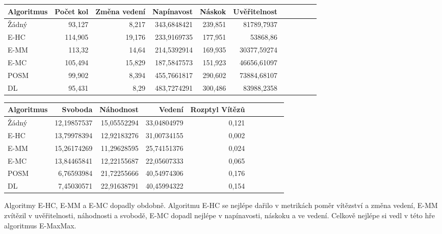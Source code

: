 \begin{table*}[b]\footnotesize
\vspace*{0mm}
\caption{{\label{tab-mazem}} Porovnání metrik zábavnosti u jednotlivých algoritmů ve hře Bludiště. Metriky změna vedení a svoboda se maximalizují, zbytek minimalizuje.}
\vspace*{0mm}
\label{shadowtable}
\begin{center}
\begin{tabular}{| l || r | r | r | r | r | r | r | r | r | r |}
\hline
Algoritmus & Počet kol	& Změna vedení & Napínavost & Náskok & Uvěřitelnost\\
\hline
\hline
Žádný & 93,127 & 8,217 & 343,6848421 & 239,851 & 81789,7937 \\ \hline  
E-HC & 114,905 & 19,176 & 233,9169735 & 177,951 & 53868,86 \\ \hline
E-MM & 113,32 & 14,64 & 214,5392914 & 169,935 & 30377,59274 \\ \hline
E-MC & 105,494 & 15,829 & 187,5847573 & 151,923 & 46656,61097 \\ \hline
POSM & 99,902 & 8,394 & 455,7661817 & 290,602 & 73884,68107 \\ \hline
DL & 95,431 & 8,29 & 483,7274291 & 300,486 & 83988,2358 \\ \hline
\end{tabular}
\end{center}
\begin{center}
\begin{tabular}{| l || r | r | r | r | r | r | r | r | r |}
\hline
Algoritmus & Svoboda & Náhodnost & Vedení &	Rozptyl Vítězů \\
\hline
\hline
Žádný & 12,19857537 & 15,05552294 & 33,04804979 & 0,121 \\ \hline  
E-HC & 13,79978394 & 12,92183276 & 31,00734155 & 0,002 \\ \hline
E-MM & 15,26174269 & 11,29628595 & 25,74151376 & 0,024 \\ \hline
E-MC & 13,84465841 & 12,22155687 & 22,05607333 & 0,065 \\ \hline
POSM & 6,76593984 & 21,72255666 & 40,54974306 & 0,176 \\ \hline
DL & 7,45030571 & 22,91638791 & 40,45994322 & 0,154 \\ \hline
\end{tabular}
\end{center}
\end{table*}

Algoritmy E-HC, E-MM a E-MC dopadly obdobně. Algoritmu E-HC se nejlépe dařilo v metrikách poměr vítězství a změna vedení, E-MM zvítězil v uvěřitelnosti, náhodnosti a svobodě, E-MC dopadl nejlépe v napínavosti, náskoku a ve vedení. Celkově nejlépe si vedl v této hře algoritmus E-MaxMax.

